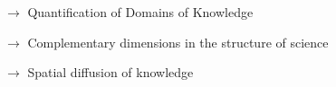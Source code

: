{$\rightarrow$ Quantification of Domains of Knowledge \cite{raimbault2017applied}

\medskip

$\rightarrow$ Complementary dimensions in the structure of science

\medskip

$\rightarrow$ Spatial diffusion of knowledge \cite{doi:10.1162isala00283} 




}








